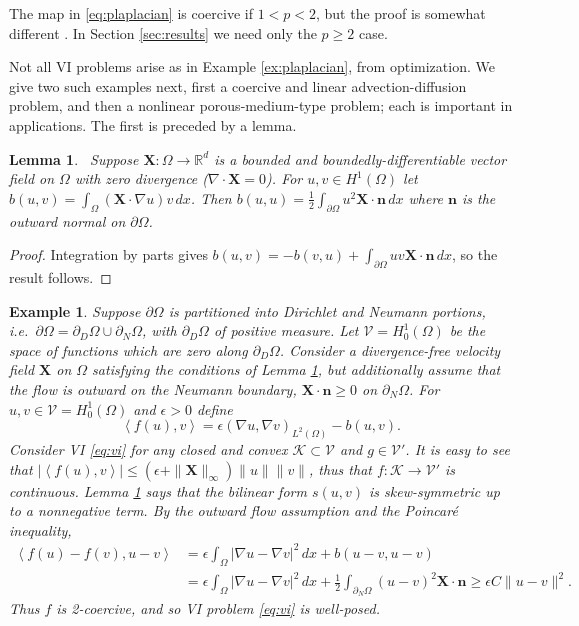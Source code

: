 \documentclass[letterpaper,final,12pt,reqno]{amsart}
\theoremstyle{cstyle}
\newtheorem{lemma}[theorem]{Lemma}
\theoremstyle{cstyle*}
\theoremstyle{dstyle}
\newtheorem{example}[theorem]{Example}
\numberwithin{equation}{section}
\numberwithin{figure}{section}
\numberwithin{table}{section}
\numberwithin{theorem}{section}
\newcommand{\eps}{\epsilon}
\newcommand{\RR}{\mathbb{R}}
\newcommand{\grad}{\nabla}
\newcommand{\Div}{\nabla\cdot}
\newcommand{\bn}{\mathbf{n}}
\newcommand{\bX}{\mathbf{X}}
\newcommand{\cK}{\mathcal{K}}
\newcommand{\cV}{\mathcal{V}}
\newcommand{\ip}[2]{\left<#1,#2\right>}
\begin{document}
The map in \eqref{eq:plaplacian} is coercive if $1<p<2$, but the proof is somewhat different \cite[Theorem 4.4]{Bueler2021conservation}.  In Section \ref{sec:results} we need only the $p\ge 2$ case.

Not all VI problems arise as in Example \ref{ex:plaplacian}, from optimization.  We give two such examples next, first a coercive and linear advection-diffusion problem, and then a nonlinear porous-medium-type problem; each is important in applications.  The first is preceded by a lemma.

\begin{lemma}  \label{lem:advectionskew}  \cite{Elmanetal2014}\,  Suppose $\bX :\Omega \to \RR^d$ is a bounded and boundedly-differentiable vector field on $\Omega$ with zero divergence ($\Div \bX=0$).  For $u,v \in H^1(\Omega)$ let $b(u,v) = \int_\Omega (\bX \cdot \grad u) v\,dx$.  Then $b(u,u) = \frac{1}{2} \int_{\partial \Omega} u^2 \bX\cdot \bn\,dx$ where $\bn$ is the outward normal on $\partial \Omega$.
\end{lemma}

\begin{proof}
Integration by parts gives $b(u,v) = - b(v,u) + \int_{\partial \Omega} uv \bX\cdot \bn\,dx$, so the result follows.
\end{proof}

\begin{example}  \label{ex:advectiondiffusion}  Suppose $\partial\Omega$ is partitioned into Dirichlet and Neumann portions, i.e.~$\partial\Omega = \partial_D\Omega \cup \partial_N\Omega$, with $\partial_D\Omega$ of positive measure.  Let $\cV = H_0^1(\Omega)$ be the space of functions which are zero along $\partial_D\Omega$.  Consider a divergence-free velocity field $\bX$ on $\Omega$ satisfying the conditions of Lemma \ref{lem:advectionskew}, but additionally assume that the flow is outward on the Neumann boundary, $\bX \cdot \bn \ge 0$ on $\partial_N\Omega$.  For $u,v \in \cV = H_0^1(\Omega)$ and $\eps>0$ define
\begin{equation}
\ip{f(u)}{v} = \eps \left(\grad u, \grad v\right)_{L^2(\Omega)} - b(u,v). \label{eq:advectiondiffusion}
\end{equation}
Consider VI \eqref{eq:vi} for any closed and convex $\cK \subset \cV$ and $g\in\cV'$.  It is easy to see that $|\ip{f(u)}{v}| \le (\eps + \|\bX\|_\infty) \|u\| \|v\|$, thus that $f:\cK \to \cV'$ is continuous.  Lemma \ref{lem:advectionskew} says that the bilinear form $s(u,v)$ is skew-symmetric up to a nonnegative term.  By the outward flow assumption and the Poincar\'e inequality,
\begin{align*}
\ip{f(u)-f(v)}{u-v} &= \eps \int_\Omega |\grad u - \grad v|^2\,dx + b(u-v,u-v) \\
                    &= \eps \int_\Omega |\grad u - \grad v|^2\,dx + \frac{1}{2} \int_{\partial_N\Omega} (u-v)^2 \bX\cdot\bn \ge \eps C \|u-v\|^2.
\end{align*}
Thus $f$ is 2-coercive, and so VI problem \eqref{eq:vi} is well-posed.
\end{example}
\end{document}
